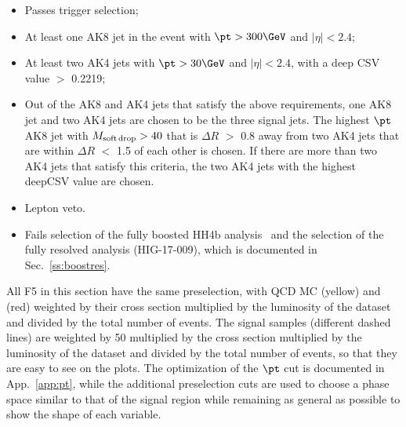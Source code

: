 \begin{itemize}
 \item Passes trigger selection;
 \item At least one AK8 jet in the event with $\pt > 300\GeV$ and $|\eta| < 2.4$;
 \item At least two AK4 jets with $\pt > 30\GeV$ and $|\eta| < 2.4$, with a deep CSV value $>$ 0.2219;
 \item Out of the AK8 and AK4 jets that satisfy the above requirements, one AK8 jet and two AK4 jets are chosen to be the three signal jets. The highest $\pt$ AK8 jet with $M_{\rm soft\,drop} > 40$ \GeV that is $\Delta R$ $>$ 0.8 away from two AK4 jets that are within $\Delta R$ $<$ 1.5 of each other is chosen. If there are more than two AK4 jets that satisfy this criteria, the two AK4 jets with the highest deepCSV value are chosen.
 \item Lepton veto.
  \item Fails selection of the fully boosted HH4b analysis~\cite{CMS-PAS-B2G-16-026} and the selection of the fully resolved analysis (HIG-17-009), which is documented in Sec.~\ref{ss:boostres}.
\end{itemize}

All F5 in this section have the same preselection, with QCD MC (yellow) and \ttbar (red) weighted by their cross section multiplied by the luminosity of the dataset and divided by the total number of events. The signal samples (different dashed lines) are weighted by 50 multiplied by the cross section multiplied by the luminosity of the dataset and divided by the total number of events, so that they are easy to see on the plots. The optimization of the $\pt$ cut is documented in App.~\ref{app:pt}, while the additional preselection cuts are used to choose a phase space similar to that of the signal region while remaining as general as possible to show the shape of each variable.

